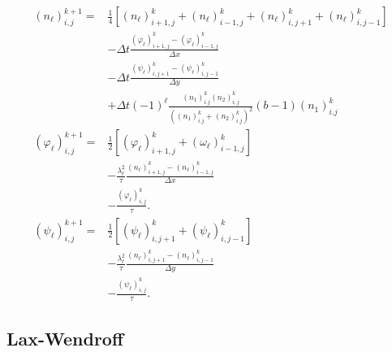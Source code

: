 \begin{align}
\left(n_{\ell}\right)_{i,j}^{k+1}= & \frac{1}{4}\left[\left(n_{\ell}\right)_{i+1,j}^{k}+\left(n_{\ell}\right)_{i-1,j}^{k}+\left(n_{\ell}\right)_{i,j+1}^{k}+\left(n_{\ell}\right)_{i,j-1}^{k}\right]\nonumber \\
 & -\Delta t\frac{\left(\varphi_{\ell}\right)_{i+1,j}^{k}-\left(\varphi_{\ell}\right)_{i-1,j}^{k}}{\Delta x}\nonumber \\
 & -\Delta t\frac{\left(\psi_{\ell}\right)_{i,j+1}^{k}-\left(\psi_{\ell}\right)_{i,j-1}^{k}}{\Delta y}\nonumber \\
 & +\Delta t\left(-1\right)^{\ell}\frac{\left(n_{1}\right)_{i.j}^{k}\left(n_{2}\right)_{i,j}^{k}}{\left(\left(n_{1}\right)_{i.j}^{k}+\left(n_{2}\right)_{i.j}^{k}\right)^{2}}\left(b-1\right)\left(n_{1}\right)_{i.j}^{k}\nonumber \\
\left(\varphi_{\ell}\right)_{i,j}^{k+1}= & \frac{1}{2}\left[\left(\varphi_{\ell}\right)_{i+1,j}^{k}+\left(\omega_{\ell}\right)_{i-1,j}^{k}\right]\nonumber \\
 & -\frac{\lambda_{\ell}^{2}}{\tau}\frac{\left(n_{\ell}\right)_{i+1,j}^{k}-\left(n_{\ell}\right)_{i-1,j}^{k}}{\Delta x}\nonumber \\
 & -\frac{\left(\varphi_{\ell}\right)_{i,j}^{k}}{\tau}.\nonumber \\
\left(\psi_{\ell}\right)_{i,j}^{k+1}= & \frac{1}{2}\left[\left(\psi_{\ell}\right)_{i,j+1}^{k}+\left(\psi_{\ell}\right)_{i,j-1}^{k}\right]\nonumber \\
 & -\frac{\lambda_{\ell}^{2}}{\tau}\frac{\left(n_{\ell}\right)_{i,j+1}^{k}-\left(n_{\ell}\right)_{i,j-1}^{k}}{\Delta y}\nonumber \\
 & -\frac{\left(\psi_{\ell}\right)_{i,j}^{k}}{\tau}.\label{eq:lax}
\end{align}


\subsection{Lax-Wendroff }

